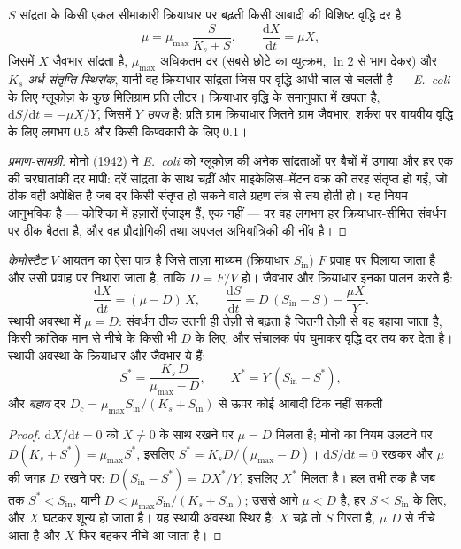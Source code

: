 \begin{theorem}[मोनो का नियम]\label{thm:b2:microbial-metabolism:monod}
$S$ सांद्रता के किसी एकल सीमाकारी क्रियाधार पर बढ़ती किसी आबादी की
विशिष्ट वृद्धि दर है
\[
\mu = \mu_{\max}\,\frac{S}{K_s + S}, \qquad \frac{\mathrm{d}X}{\mathrm{d}t} = \mu X,
\]
जिसमें $X$ जैवभार सांद्रता है, $\mu_{\max}$ अधिकतम दर (सबसे छोटे
 का व्युत्क्रम, $\ln 2$ से भाग देकर) और $K_s$
\emph{अर्ध-संतृप्ति स्थिरांक}, यानी वह क्रियाधार सांद्रता जिस पर वृद्धि
आधी चाल से चलती है --- \emph{E.~coli} के लिए ग्लूकोज़ के कुछ मिलिग्राम
प्रति लीटर। क्रियाधार वृद्धि के समानुपात में खपता है,
$\mathrm{d}S/\mathrm{d}t =
-\mu X/Y$, जिसमें $Y$ \emph{उपज} है: प्रति ग्राम क्रियाधार जितने ग्राम
जैवभार, शर्करा पर वायवीय वृद्धि के लिए लगभग \num{0.5} और किसी
किण्वकारी के लिए \num{0.1}।
\end{theorem}
\begin{proof}[प्रमाण-सामग्री]
मोनो (1942) ने \emph{E.~coli} को ग्लूकोज़ की अनेक सांद्रताओं पर बैचों
में उगाया और हर एक की चरघातांकी दर मापी: दरें सांद्रता के साथ चढ़ीं और
माइकेलिस--मेंटन वक्र की तरह संतृप्त हो गईं, जो ठीक वही अपेक्षित है जब दर
किसी संतृप्त हो सकने वाले ग्रहण तंत्र से तय होती हो। यह नियम आनुभविक है
--- कोशिका में हज़ारों एंजाइम हैं, एक नहीं --- पर वह लगभग हर
क्रियाधार-सीमित संवर्धन पर ठीक बैठता है, और वह  प्रौद्योगिकी
तथा अपजल अभियांत्रिकी की नींव है।
\end{proof}

\begin{theorem}[केमोस्टैट]\label{thm:b2:microbial-metabolism:chemostat}
\emph{केमोस्टैट} $V$ आयतन का ऐसा पात्र है जिसे ताज़ा माध्यम (क्रियाधार
$S_{\mathrm{in}}$) $F$ प्रवाह पर पिलाया जाता है और उसी प्रवाह पर निथारा
जाता है, ताकि \emph{} $D = F/V$ हो। जैवभार और
क्रियाधार इनका पालन करते हैं:
\[
\frac{\mathrm{d}X}{\mathrm{d}t} = (\mu - D)\,X, \qquad
\frac{\mathrm{d}S}{\mathrm{d}t} = D\,(S_{\mathrm{in}} - S) - \frac{\mu X}{Y}.
\]
स्थायी अवस्था में $\mu = D$: संवर्धन ठीक उतनी ही तेज़ी से बढ़ता है जितनी
तेज़ी से वह बहाया जाता है, किसी क्रांतिक मान से नीचे के किसी भी $D$ के
लिए, और संचालक पंप घुमाकर वृद्धि दर तय कर देता है। स्थायी अवस्था के
क्रियाधार और जैवभार ये हैं:
\[
S^* = \frac{K_s\,D}{\mu_{\max} - D}, \qquad X^* = Y\,(S_{\mathrm{in}} - S^*),
\]
और \emph{बहाव} दर $D_c = \mu_{\max}
S_{\mathrm{in}}/(K_s + S_{\mathrm{in}})$ से ऊपर कोई आबादी टिक नहीं सकती।
\end{theorem}
\begin{proof}
$\mathrm{d}X/\mathrm{d}t = 0$ को $X \neq 0$ के साथ रखने पर $\mu = D$ मिलता है;
मोनो का नियम उलटने पर $D(K_s + S^*) = \mu_{\max} S^*$, इसलिए $S^* =
K_s D/(\mu_{\max} - D)$। $\mathrm{d}S/\mathrm{d}t = 0$ रखकर और $\mu$ की
जगह $D$ रखने पर: $D(S_{\mathrm{in}} - S^*) = DX^*/Y$, इसलिए
$X^*$ मिलता है। हल तभी तक है जब तक $S^* < S_{\mathrm{in}}$, यानी
$D < \mu_{\max} S_{\mathrm{in}}/(K_s + S_{\mathrm{in}})$; उससे आगे $\mu < D$ है,
हर $S \le S_{\mathrm{in}}$ के लिए, और $X$ घटकर शून्य हो जाता है।
यह स्थायी अवस्था स्थिर है: $X$ चढ़े तो $S$ गिरता है, $\mu$ $D$ से नीचे
आता है और $X$ फिर बहकर नीचे आ जाता है।
\end{proof}

